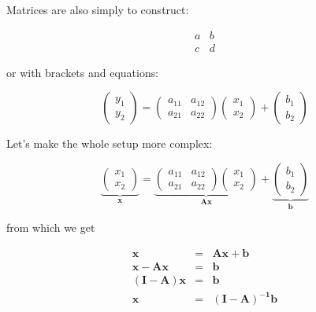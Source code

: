 \documentclass[11pt]{article}
\numberwithin{table}{section}   %
\begin{document}
Matrices are also simply to construct:

\begin{equation}
    \begin{matrix}
        a & b   \\
        c & d
    \end{matrix}
\end{equation}

or with brackets and equations:

\begin{equation}
    \begin{pmatrix}
        y_1  \\ y_2
    \end{pmatrix}
    =
    \begin{pmatrix}
        a_{11} & a_{12}   \\
        a_{21} & a_{22}
    \end{pmatrix}
    \begin{pmatrix}
        x_1  \\ x_2
    \end{pmatrix}
    +
    \begin{pmatrix}
        b_1  \\ b_2
    \end{pmatrix}
\end{equation}

Let's make the whole setup more complex:

\begin{equation}
    \underbrace{\begin{pmatrix}
        x_1  \\ x_2
    \end{pmatrix}}_{\bm{x}}
    =
    \underbrace{\begin{pmatrix}
        a_{11} & a_{12}   \\
        a_{21} & a_{22}
    \end{pmatrix}
    \begin{pmatrix}
        x_1  \\ x_2
    \end{pmatrix}}_{\bm{Ax}}
    +
    \underbrace{\begin{pmatrix}
        b_1  \\ b_2
    \end{pmatrix}}_{\bm{b}}
\end{equation}

from which we get

\begin{eqnarray}
    \mathbf{x} &=& \mathbf{Ax} + \mathbf{b} \\ \nonumber
    \mathbf{x - Ax} &=& \mathbf{b} \\ \nonumber
    \mathbf{(I - A)x} &=& \mathbf{b} \\ \nonumber
    \mathbf{x} &=& \mathbf{(I - A)^{-1}b}
\end{eqnarray}
\end{document}
